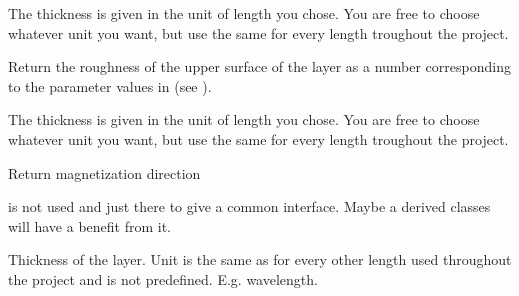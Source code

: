 \documentclass[letterpaper,10pt,english]{sphinxmanual}
\begin{document}
\begin{fulllineitems}
\begin{fulllineitems}
The thickness is given in the unit of length you chose. You are free to choose whatever unit you want, but use the same for every length troughout the project.

\end{fulllineitems}


\begin{fulllineitems}
\label{\detokenize{modules-api/samplerepresentation:SampleRepresentation.LayerObject.getSigma}}
Return the roughness of the upper surface of the layer as a number corresponding to the parameter values in  (see {\hyperref[\detokenize{modules-api/parameters:module-Parameters}]{}}).

The thickness is given in the unit of length you chose. You are free to choose whatever unit you want, but use the same for every length troughout the project.

\end{fulllineitems}


\begin{fulllineitems}
\label{\detokenize{modules-api/samplerepresentation:SampleRepresentation.LayerObject.getMagDir}}
Return magnetization direction

 is not used and just there to give a common interface. Maybe a derived classes will have a benefit from it.

\end{fulllineitems}


\begin{fulllineitems}
\label{\detokenize{modules-api/samplerepresentation:SampleRepresentation.LayerObject.d}}
Thickness of the layer. Unit is the same as for every other length used throughout the project and is not predefined. E.g. wavelength.

\end{fulllineitems}



\end{fulllineitems}
\end{document}
